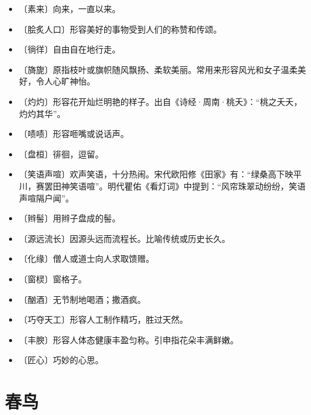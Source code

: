 \documentclass[12pt,UTF-8,openany]{ctexbook}
\begin{document}
\begin{itemize}
    \setlength\itemsep{-0.2em}
    \item 〔素来〕向来，一直以来。
    \item 〔脍炙人口〕形容美好的事物受到人们的称赞和传颂。
    \item 〔徜徉〕自由自在地行走。
    \item 〔旖旎〕原指枝叶或旗帜随风飘扬、柔软美丽。常用来形容风光和女子温柔美好，令人心旷神怡。
    \item 〔灼灼〕形容花开灿烂明艳的样子。出自《诗经·周南·桃夭》：“桃之夭夭，灼灼其华”。
    \item 〔啧啧〕形容咂嘴或说话声。
    \item 〔盘桓〕徘徊，逗留。
    \item 〔笑语声喧〕欢声笑语，十分热闹。宋代欧阳修《田家》有：“绿桑高下映平川，赛罢田神笑语喧”。明代瞿佑《看灯词》中提到：“风帘珠翠动纷纷，笑语声喧隔户闻”。
    \item 〔辫髻〕用辫子盘成的髻。
    \item 〔源远流长〕因源头远而流程长。比喻传统或历史长久。
    \item 〔化缘〕僧人或道士向人求取馈赠。
    \item 〔窗棂〕窗格子。
    \item 〔酗酒〕无节制地喝酒；撒酒疯。
    \item 〔巧夺天工〕形容人工制作精巧，胜过天然。
    \item 〔丰腴〕形容人体态健康丰盈匀称。引申指花朵丰满鲜嫩。
    \item 〔匠心〕巧妙的心思。
\end{itemize}

\chapter{春鸟}
\end{document}
